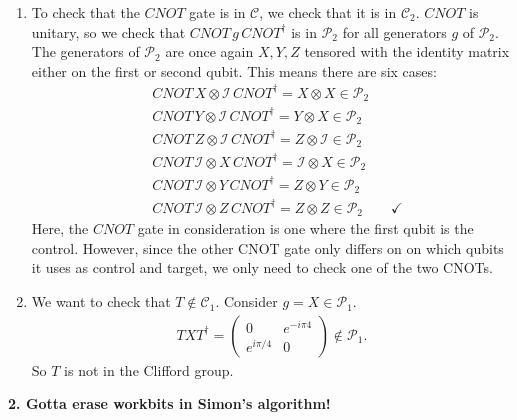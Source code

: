 \documentclass{article}
\theoremstyle{definition}
\newcommand{\Id}{\mathcal{I}}
\begin{document}
\begin{enumerate}[label=(\alph*)]
	\item To check that the $CNOT$ gate is in $\mathcal{C}$, we check that it is in $\mathcal{C}_2$. $CNOT$ is unitary, so we check that $CNOT \, g \, CNOT^\dagger$ is in $\mathcal{P}_2$ for all generators $g$ of $\mathcal{P}_2$. The generators of $\mathcal{P}_2$ are once again $X,Y,Z$ tensored with the identity matrix either on the first or second qubit. This means there are six cases:
	 \begin{align*}
	 	&CNOT\,X \otimes \Id \,CNOT^\dagger = X\otimes X \in \mathcal{P}_2 \\
	 	&CNOT\,Y \otimes \Id \,CNOT^\dagger = Y\otimes X \in \mathcal{P}_2 \\
	 	&CNOT\,Z \otimes \Id \,CNOT^\dagger = Z\otimes \Id \in \mathcal{P}_2 \\
	 	&CNOT\,\Id \otimes X \,CNOT^\dagger = \Id \otimes X \in \mathcal{P}_2 \\
	 	&CNOT\,\Id \otimes Y \,CNOT^\dagger = Z \otimes Y \in \mathcal{P}_2 \\
	 	&CNOT\,\Id \otimes Z \,CNOT^\dagger = Z \otimes Z \in \mathcal{P}_2 \quad\quad \checkmark
	 \end{align*}
 	Here, the $CNOT$ gate in consideration is one where the first qubit is the control. However, since the other CNOT gate only differs on on which qubits it uses as control and target, we only need to check one of the two CNOTs.
	
	\item We want to check that $T\notin \mathcal{C}_1$. Consider $g = X\in \mathcal{P}_1$. 
	\begin{align*}
		TXT^\dagger = \begin{pmatrix}
			0 & e^{-i\pi4} \\ e^{i\pi/4} & 0
		\end{pmatrix} \notin \mathcal{P}_1.
	\end{align*}
	So $T$ is not in the Clifford group.
\end{enumerate}



\noindent \textbf{2. Gotta erase workbits in Simon's algorithm!}\\
\end{document}
